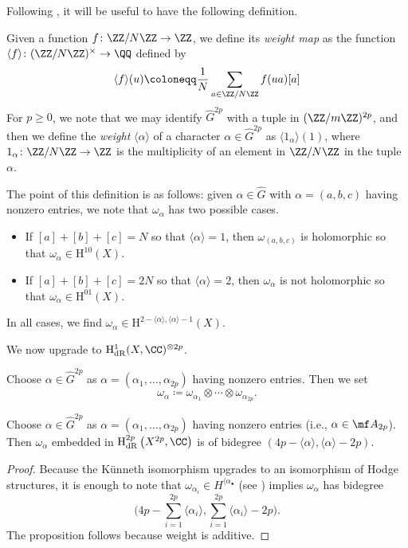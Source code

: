 \documentclass[../thesis.tex]{subfiles}
\begin{document}
Following \cite[Proposition~7.6]{deligne-hodge}, it will be useful to have the following definition.
\begin{definition}[weight]
	Given a function $f\colon\ZZ/N\ZZ\to\ZZ$, we define its \textit{weight map} as the function $\langle f\rangle\colon(\ZZ/N\ZZ)^\times\to\QQ$ defined by
	\[\langle f\rangle(u)\coloneqq\frac1N\sum_{a\in\ZZ/N\ZZ}f(ua)[a]\]
	For $p\ge0$, we note that we may identify $\widehat G^{2p}$ with a tuple in $(\ZZ/m\ZZ)^{2p}$, and then we define the \textit{weight} $\langle\alpha\rangle$ of a character $\alpha\in\widehat G^{2p}$ as $\langle1_\alpha\rangle(1)$, where $1_\alpha\colon\ZZ/N\ZZ\to\ZZ$ is the multiplicity of an element in $\ZZ/N\ZZ$ in the tuple $\alpha$. 
\end{definition}
\begin{remark} \label{rem:deg-by-weight-curve}
	The point of this definition is as follows: given $\alpha\in\widehat G$ with $\alpha=(a,b,c)$ having nonzero entries, we note that $\omega_{\alpha}$ has two possible cases.
	\begin{itemize}
		\item If $[a]+[b]+[c]=N$ so that $\langle\alpha\rangle=1$, then $\omega_{(a,b,c)}$ is holomorphic so that $\omega_{\alpha}\in\mathrm H^{10}(X)$.
		\item If $[a]+[b]+[c]=2N$ so that $\langle\alpha\rangle=2$, then $\omega_{\alpha}$ is not holomorphic so that $\omega_{\alpha}\in\mathrm H^{01}(X)$.
	\end{itemize}
	In all cases, we find $\omega_{\alpha}\in\mathrm H^{2-\langle\alpha\rangle,\langle\alpha\rangle-1}(X)$.
\end{remark}
We now upgrade  to $\mathrm H^1_{\mathrm{dR}}(X,\CC)^{\otimes2p}$.
\begin{notation}
	Choose $\alpha\in\widehat G^{2p}$ as $\alpha=(\alpha_1,\ldots,\alpha_{2p})$ having nonzero entries. Then we set
	\[\omega_{\alpha}\coloneqq\omega_{\alpha_1}\otimes\cdots\otimes\omega_{\alpha_{2p}}.\]
\end{notation}
\begin{lemma} \label{lem:deg-by-weight-curve-power}
	Choose $\alpha\in\widehat G^{2p}$ as $\alpha=(\alpha_1,\ldots,\alpha_{2p})$ having nonzero entries (i.e., $\alpha\in\mf A_{2p}$). Then $\omega_\alpha$ embedded in $\mathrm H^{2p}_{\mathrm{dR}}\left(X^{2p},\CC\right)$ is of bidegree $(4p-\langle\alpha\rangle,\langle\alpha\rangle-2p)$.
\end{lemma}
\begin{proof}
	Because the K\"unneth isomorphism upgrades to an isomorphism of Hodge structures, it is enough to note that $\omega_{\alpha_i}\in H^{\langle\alpha_\bullet}$ (see ) implies $\omega_\alpha$ has bidegree
	\[\Bigg(4p-\sum_{i=1}^{2p}\langle\alpha_i\rangle,\sum_{i=1}^{2p}\langle\alpha_i\rangle-2p\Bigg).\]
	The proposition follows because weight is additive.
\end{proof}
\end{document}

